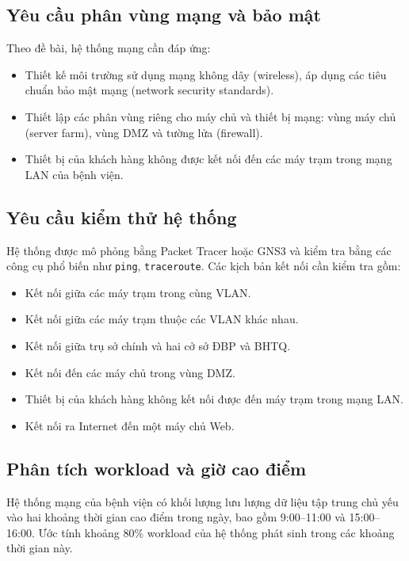 \subsection{Yêu cầu phân vùng mạng và bảo mật}
Theo đề bài, hệ thống mạng cần đáp ứng:
\begin{itemize}
    \item Thiết kế môi trường sử dụng mạng không dây (wireless), áp dụng các tiêu chuẩn bảo mật mạng (network security standards).
    \item Thiết lập các phân vùng riêng cho máy chủ và thiết bị mạng: vùng máy chủ (server farm), vùng DMZ và tường lửa (firewall).
    \item Thiết bị của khách hàng không được kết nối đến các máy trạm trong mạng LAN của bệnh viện.
\end{itemize}

\subsection{Yêu cầu kiểm thử hệ thống}
Hệ thống được mô phỏng bằng Packet Tracer hoặc GNS3 và kiểm tra bằng các công cụ phổ biến như \texttt{ping}, \texttt{traceroute}. Các kịch bản kết nối cần kiểm tra gồm:
\begin{itemize}
    \item Kết nối giữa các máy trạm trong cùng VLAN.
    \item Kết nối giữa các máy trạm thuộc các VLAN khác nhau.
    \item Kết nối giữa trụ sở chính và hai cở sở ĐBP và BHTQ.
    \item Kết nối đến các máy chủ trong vùng DMZ.
    \item Thiết bị của khách hàng không kết nối được đến máy trạm trong mạng LAN.
    \item Kết nối ra Internet đến một máy chủ Web.
\end{itemize}

\subsection{Phân tích workload và giờ cao điểm}
Hệ thống mạng của bệnh viện có khối lượng lưu lượng dữ liệu tập trung chủ yếu vào hai khoảng thời gian cao điểm trong ngày, bao gồm 9:00--11:00 và 15:00--16:00. Ước tính khoảng 80\% workload của hệ thống phát sinh trong các khoảng thời gian này.

